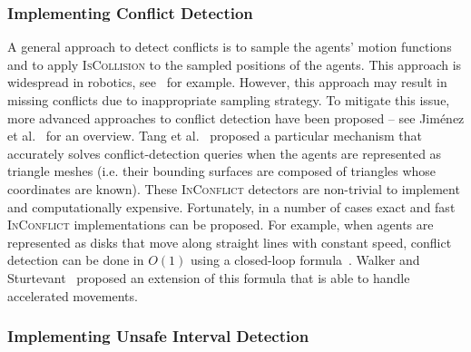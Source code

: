 \documentclass[review]{elsarticle}
\newcommand{\iscollision}{\textsc{IsCollision}\xspace}
\newcommand{\inconflict}{\textsc{InConflict}\xspace}
\newcommand{\shortcite}{\cite}
\begin{document}
\subsubsection{Implementing Conflict Detection}
A general approach to detect conflicts is to sample the agents' motion functions and to apply \iscollision to the sampled positions of the agents. This approach is widespread in robotics, see~\cite{cameron1985study} for example. However, this approach may result in missing conflicts due to inappropriate sampling strategy. To mitigate this issue, more advanced approaches to conflict detection have been proposed -- see Jim{\'e}nez et al.~\shortcite{jimenez20013d} for an overview. 
Tang et al.~\cite{tang2014fast} proposed a particular mechanism that accurately solves conflict-detection queries when the agents are represented as triangle meshes (i.e. their bounding surfaces are composed of triangles whose coordinates are known). These \inconflict detectors are non-trivial to implement and computationally expensive. Fortunately, in a number of cases exact and fast \inconflict implementations can be proposed. For example, when agents are represented as disks that move along straight lines with constant speed, conflict detection can be done in $O(1)$ using a closed-loop formula~\cite{guy2015}. 
Walker and Sturtevant~\cite{walker2019collision} proposed an extension of this formula that is able to handle accelerated movements. 




\subsubsection{Implementing Unsafe Interval Detection}
\end{document}
